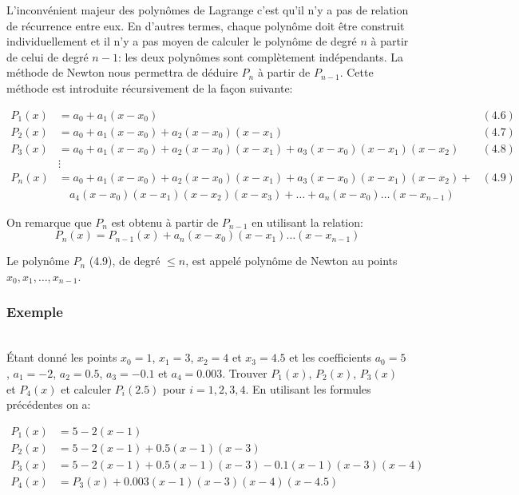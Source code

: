 L'inconvénient majeur des polynômes de Lagrange c'est qu'il n'y a pas de relation de récurrence entre eux. En d'autres termes, chaque polynôme doit être construit individuellement et il n'y a pas moyen de calculer le polynôme de degré $n$ à partir de celui de degré $n-1$: les deux polynômes sont complètement indépendants. La méthode de Newton nous permettra de déduire $P_n$ à partir de $P_{n-1}$. Cette méthode est introduite récursivement de la façon suivante:

\begin{align*}
P_1(x) &= a_0 + a_1(x-x_0) & (4.6) \\
P_2(x) &= a_0 + a_1(x-x_0) + a_2(x-x_0)(x-x_1) & (4.7) \\
P_3(x) &= a_0 + a_1(x-x_0) + a_2(x-x_0)(x-x_1) + a_3(x-x_0)(x-x_1)(x-x_2) & (4.8) \\
&\vdots & \\
P_n(x) &= a_0 + a_1(x-x_0) + a_2(x-x_0)(x-x_1) + a_3(x-x_0)(x-x_1)(x-x_2) + & (4.9) \\
& \quad a_4(x-x_0)(x-x_1)(x-x_2)(x-x_3) + \ldots + a_n(x-x_0)\ldots(x-x_{n-1})
\end{align*}

On remarque que $P_n$ est obtenu à partir de $P_{n-1}$ en utilisant la relation:
\[
P_n(x) = P_{n-1}(x) + a_n(x-x_0)(x-x_1)\ldots(x-x_{n-1})
\]

Le polynôme $P_n$ (4.9), de degré $\leq n$, est appelé polynôme de Newton au points $x_0, x_1, \ldots, x_{n-1}$.

\subsubsection{Exemple}\ \\

Étant donné les points $x_0 = 1$, $x_1 = 3$, $x_2 = 4$ et $x_3 = 4.5$ et les coefficients $a_0 = 5$, $a_1 = -2$, $a_2 = 0.5$, $a_3 = -0.1$ et $a_4 = 0.003$. Trouver $P_1(x)$, $P_2(x)$, $P_3(x)$ et $P_4(x)$ et calculer $P_i(2.5)$ pour $i = 1, 2, 3, 4$. En utilisant les formules précédentes on a:

\begin{align*}
P_1(x) &= 5 - 2(x-1) \\
P_2(x) &= 5 - 2(x-1) + 0.5(x-1)(x-3) \\
P_3(x) &= 5 - 2(x-1) + 0.5(x-1)(x-3) - 0.1(x-1)(x-3)(x-4) \\
P_4(x) &= P_3(x) + 0.003(x-1)(x-3)(x-4)(x-4.5)
\end{align*}

